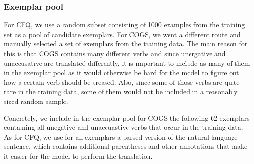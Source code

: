 \documentclass{article} \usepackage{iclr2022_conference,times}
\begin{document}
\subsubsection{Exemplar pool}

For CFQ, we use a random subset consisting of 1000 examples from the training set as a pool of candidate exemplars. For COGS, we went a different route and manually selected a set of exemplars from the training data. The main reason for this is that COGS contains many different verbs and since unergative and unaccusative are translated differently, it is important to include as many of them in the exemplar pool as it would otherwise be hard for the model to figure out how a certain verb should be treated. Also, since some of those verbs are quite rare in the training data, some of them would not be included in a reasonably sized random sample.

Concretely, we include in the exemplar pool for COGS the following 62 exemplars containing all unegative and unaccuastive verbs that occur in the training data. As for CFQ, we use for all exemplars a parsed version of the natural language sentence, which contains additional parentheses and other annotations that make it easier for the model to perform the translation.
\end{document}
